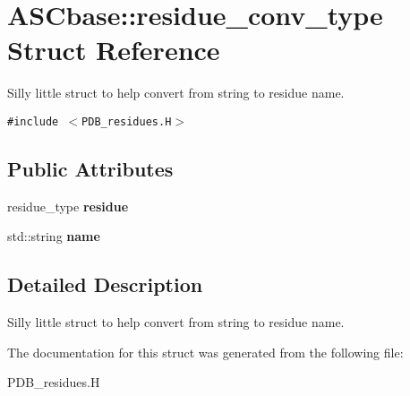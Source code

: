 \section{ASCbase::residue\_\-conv\_\-type Struct Reference}
\label{structASCbase_1_1residue__conv__type}
Silly little struct to help convert from string to residue name.  


{\tt \#include $<$PDB\_\-residues.H$>$}

\subsection*{Public Attributes}
\begin{CompactItemize}
\item 
residue\_\-type \textbf{residue}\label{structASCbase_1_1residue__conv__type_52f8acfdb1c1877592360527484b7da6}

\item 
std::string \textbf{name}\label{structASCbase_1_1residue__conv__type_a282bb2bec2f7ed9e2786ba3a5ac443b}

\end{CompactItemize}


\subsection{Detailed Description}
Silly little struct to help convert from string to residue name. 



The documentation for this struct was generated from the following file:\begin{CompactItemize}
\item 
PDB\_\-residues.H\end{CompactItemize}
